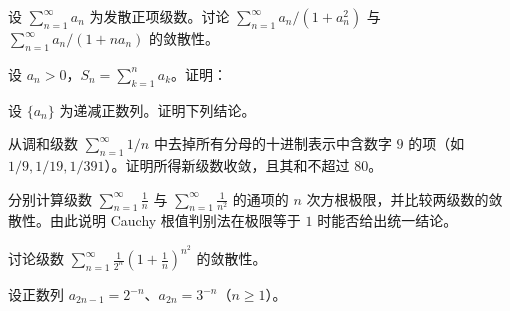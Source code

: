 \noindent\begin{minipage}{\textwidth}
设 $\sum_{n=1}^{\infty}a_n$ 为发散正项级数。讨论 $\sum_{n=1}^{\infty}a_n/(1+a_n^2)$ 与 $\sum_{n=1}^{\infty}a_n/(1+na_n)$ 的敛散性。
\end{minipage}\par\vfill
\newpage
\noindent\begin{minipage}{\textwidth}
设 $a_n>0$，$S_n=\sum_{k=1}^na_k$。证明：
\end{minipage}\par\vfill
\noindent\begin{minipage}{\textwidth}
设 $\{a_n\}$ 为递减正数列。证明下列结论。
\end{minipage}\par\vfill
\noindent\begin{minipage}{\textwidth}
从调和级数 $\sum_{n=1}^{\infty}1/n$ 中去掉所有分母的十进制表示中含数字 $9$ 的项（如 $1/9,1/19,1/391$）。证明所得新级数收敛，且其和不超过 $80$。
\end{minipage}\par\vfill
\newpage
\noindent\begin{minipage}{\textwidth}
分别计算级数 $\displaystyle\sum_{n=1}^{\infty}\frac1n$ 与 $\displaystyle\sum_{n=1}^{\infty}\frac1{n^2}$ 的通项的 $n$ 次方根极限，并比较两级数的敛散性。由此说明 Cauchy 根值判别法在极限等于 $1$ 时能否给出统一结论。
\end{minipage}\par\vfill
\noindent\begin{minipage}{\textwidth}
讨论级数 $\displaystyle\sum_{n=1}^{\infty}\frac1{2^n}\left(1+\frac1n\right)^{n^2}$ 的敛散性。
\end{minipage}\par\vfill
\noindent\begin{minipage}{\textwidth}
设正数列 $a_{2n-1}=2^{-n}$、$a_{2n}=3^{-n}$（$n\ge1$）。
\end{minipage}\par\vfill
